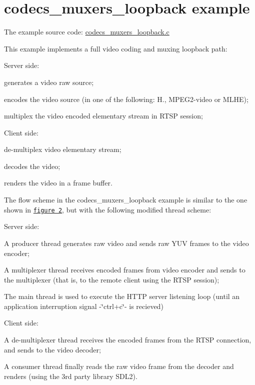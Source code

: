 \section*{codecs\+\_\+muxers\+\_\+loopback example }

The example source code\+: \hyperlink{codecs__muxers__loopback_8c}{codecs\+\_\+muxers\+\_\+loopback.\+c}

This example implements a full video coding and muxing loopback path\+:
\begin{DoxyItemize}
\item Server side\+:
\begin{DoxyItemize}
\item generates a video raw source;
\item encodes the video source (in one of the following\+: H., M\+P\+E\+G2-\/video or M\+L\+HE);
\item multiplex the video encoded elementary stream in R\+T\+SP session;
\end{DoxyItemize}
\item Client side\+:
\begin{DoxyItemize}
\item de-\/multiplex video elementary stream;
\item decodes the video;
\item renders the video in a frame buffer.
\end{DoxyItemize}
\end{DoxyItemize}

The flow scheme in the codecs\+\_\+muxers\+\_\+loopback example is similar to the one shown in \href{md_DOCUMENTATION.html#How_to_use_a_Processor_the_API}{\tt figure 2}, but with the following modified thread scheme\+:
\begin{DoxyItemize}
\item Server side\+:
\begin{DoxyItemize}
\item A \textquotesingle{}producer thread\textquotesingle{} generates raw video and sends raw Y\+UV frames to the video encoder;
\item A \textquotesingle{}multiplexer thread\textquotesingle{} receives encoded frames from video encoder and sends to the multiplexer (that is, to the remote client using the R\+T\+SP session);
\item The main thread is used to execute the H\+T\+TP server listening loop (until an application interruption signal -\/\char`\"{}ctrl+c\char`\"{}-\/ is recieved)
\end{DoxyItemize}
\item Client side\+:
\begin{DoxyItemize}
\item A \textquotesingle{}de-\/multiplexer thread\textquotesingle{} receives the encoded frames from the R\+T\+SP connection, and sends to the video decoder;
\item A \textquotesingle{}consumer thread\textquotesingle{} finally reads the raw video frame from the decoder and renders (using the 3rd party library S\+D\+L2).
\end{DoxyItemize}
\end{DoxyItemize}

